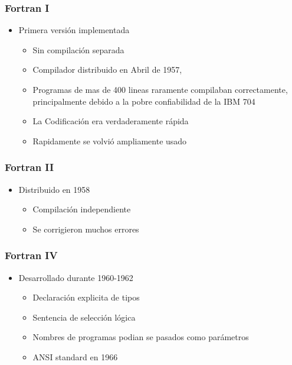 \documentclass[11pt]{article}
\begin{document}
\subsubsection*{Fortran I}
\label{sec:orgheadline42}
\begin{itemize}
\item Primera versión implementada
\begin{itemize}
\item Sin compilación separada
\item Compilador distribuido en Abril de 1957,
\item Programas de mas de 400 lineas raramente compilaban correctamente,
principalmente debido a la pobre confiabilidad de la IBM 704
\item La Codificación era verdaderamente rápida
\item Rapidamente se volvió ampliamente usado
\end{itemize}
\end{itemize}

\subsubsection*{Fortran II}
\label{sec:orgheadline43}
\begin{itemize}
\item Distribuido en 1958
\begin{itemize}
\item Compilación independiente
\item Se corrigieron muchos errores
\end{itemize}
\end{itemize}

\subsubsection*{Fortran IV}
\label{sec:orgheadline44}
\begin{itemize}
\item Desarrollado durante 1960-1962
\begin{itemize}
\item Declaración explicita de tipos
\item Sentencia de selección lógica
\item Nombres de programas podian se pasados como parámetros
\item ANSI standard en 1966
\end{itemize}
\end{itemize}
\end{document}
